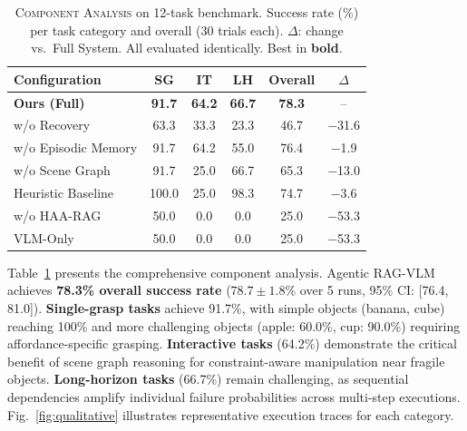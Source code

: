 \documentclass[letterpaper, 10pt, conference]{ieeeconf}
\newcommand{\sysname}{Agentic RAG-VLM}
\begin{document}
\begin{table}[t]
\centering
\caption{\textsc{Component Analysis} on 12-task benchmark. Success rate (\%) per task category and overall (30 trials each). $\Delta$: change vs.\ Full System. All evaluated identically. Best in \textbf{bold}.}
\label{tab:sota}
\renewcommand{\arraystretch}{1.08}
\setlength{\tabcolsep}{3pt}
\begin{tabular}{@{}lccccc@{}}
\toprule
\textbf{Configuration} & \textbf{SG} & \textbf{IT} & \textbf{LH} & \textbf{Overall} & $\Delta$ \\
\midrule
\textbf{Ours (Full)} & \textbf{91.7} & \textbf{64.2} & \textbf{66.7} & \textbf{78.3} & -- \\
w/o Recovery & 63.3 & 33.3 & 23.3 & 46.7 & $-$31.6 \\
w/o Episodic Memory & 91.7 & 64.2 & 55.0 & 76.4 & $-$1.9 \\
w/o Scene Graph & 91.7 & 25.0 & 66.7 & 65.3 & $-$13.0 \\
Heuristic Baseline & 100.0 & 25.0 & 98.3 & 74.7 & $-$3.6 \\
w/o HAA-RAG & 50.0 & 0.0 & 0.0 & 25.0 & $-$53.3 \\
VLM-Only & 50.0 & 0.0 & 0.0 & 25.0 & $-$53.3 \\
\bottomrule
\end{tabular}
\vspace{-2mm}
\end{table}

Table~\ref{tab:sota} presents the comprehensive component analysis.
\sysname{} achieves \textbf{78.3\% overall success rate} ($78.7 \pm 1.8\%$ over 5 runs, 95\% CI: [76.4, 81.0]).
\textbf{Single-grasp tasks} achieve 91.7\%, with simple objects (banana, cube) reaching 100\% and more challenging objects (apple: 60.0\%, cup: 90.0\%) requiring affordance-specific grasping.
\textbf{Interactive tasks} (64.2\%) demonstrate the critical benefit of scene graph reasoning for constraint-aware manipulation near fragile objects.
\textbf{Long-horizon tasks} (66.7\%) remain challenging, as sequential dependencies amplify individual failure probabilities across multi-step executions.
Fig.~\ref{fig:qualitative} illustrates representative execution traces for each category.
\end{document}
